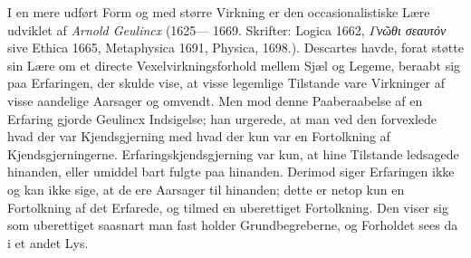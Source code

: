 \documentclass[12pt,a4paper]{book}
\newcommand{\gk}[1]{\textit{#1}}
\begin{document}
I en mere udført Form og med større Virkning er den
occasionalistiske Lære udviklet af \emph{Arnold Geulincx} (1625---%
1669. Skrifter: Logica 1662, \gk{Γνῶθι σεαυτόν} sive Ethica 1665,
Metaphysica 1691, Physica, 1698.). Descartes havde, forat
støtte sin Lære om et directe Vexelvirkningsforhold mellem
Sjæl og Legeme, beraabt sig paa Erfaringen, der skulde vise,
at visse legemlige Tilstande vare Virkninger af visse aandelige
Aarsager og omvendt. Men mod denne Paaberaabelse af en
Erfaring gjorde Geulincx Indsigelse; han urgerede, at man ved
den forvexlede hvad der var Kjendsgjerning med hvad der kun var
en Fortolkning af Kjendsgjerningerne. Erfaringskjendsgjerning
var kun, at hine Tilstande ledsagede hinanden, eller umiddel\-%
bart fulgte paa hinanden. Derimod siger Erfaringen ikke og
kan ikke sige, at de ere Aarsager til hinanden; dette er netop
kun en Fortolkning af det Erfarede, og tilmed en uberettiget
Fortolkning. Den viser sig som uberettiget saasnart man fast\-%
holder Grundbegreberne, og Forholdet sees da i et andet Lys.
\end{document}
